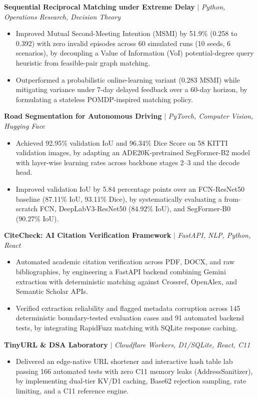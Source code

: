 \documentclass[10pt, a4paper]{article}
\begin{document}
\textbf{Sequential Reciprocal Matching under Extreme Delay} $|$ \textit{Python, Operations Research, Decision Theory}
\begin{itemize}[leftmargin=*, noitemsep, topsep=1pt, parsep=0pt]
    \item Improved Mutual Second-Meeting Intention (MSMI) by 51.9\% (0.258 to 0.392) with zero invalid episodes across 60 simulated runs (10 seeds, 6 scenarios), by decoupling a Value of Information (VoI) potential-degree query heuristic from feasible-pair graph matching.
    \item Outperformed a probabilistic online-learning variant (0.283 MSMI) while mitigating variance under 7-day delayed feedback over a 60-day horizon, by formulating a stateless POMDP-inspired matching policy.
\end{itemize}

\textbf{Road Segmentation for Autonomous Driving} $|$ \textit{PyTorch, Computer Vision, Hugging Face}
\begin{itemize}[leftmargin=*, noitemsep, topsep=1pt, parsep=0pt]
    \item Achieved 92.95\% validation IoU and 96.34\% Dice Score on 58 KITTI validation images, by adapting an ADE20K-pretrained SegFormer-B2 model with layer-wise learning rates across backbone stages 2--3 and the decode head.
    \item Improved validation IoU by 5.84 percentage points over an FCN-ResNet50 baseline (87.11\% IoU, 93.11\% Dice), by systematically evaluating a from-scratch FCN, DeepLabV3-ResNet50 (84.92\% IoU), and SegFormer-B0 (90.27\% IoU).
\end{itemize}

\textbf{CiteCheck: AI Citation Verification Framework} $|$ \textit{FastAPI, NLP, Python, React}
\begin{itemize}[leftmargin=*, noitemsep, topsep=1pt, parsep=0pt]
    \item Automated academic citation verification across PDF, DOCX, and raw bibliographies, by engineering a FastAPI backend combining Gemini extraction with deterministic matching against Crossref, OpenAlex, and Semantic Scholar APIs.
    \item Verified extraction reliability and flagged metadata corruption across 145 deterministic boundary-tested evaluation cases and 91 automated backend tests, by integrating RapidFuzz matching with SQLite response caching.
\end{itemize}

\textbf{TinyURL \& DSA Laboratory} $|$ \textit{Cloudflare Workers, D1/SQLite, React, C11}
\begin{itemize}[leftmargin=*, noitemsep, topsep=1pt, parsep=0pt]
    \item Delivered an edge-native URL shortener and interactive hash table lab passing 166 automated tests with zero C11 memory leaks (AddressSanitizer), by implementing dual-tier KV/D1 caching, Base62 rejection sampling, rate limiting, and a C11 reference engine.
\end{itemize}
\end{document}
